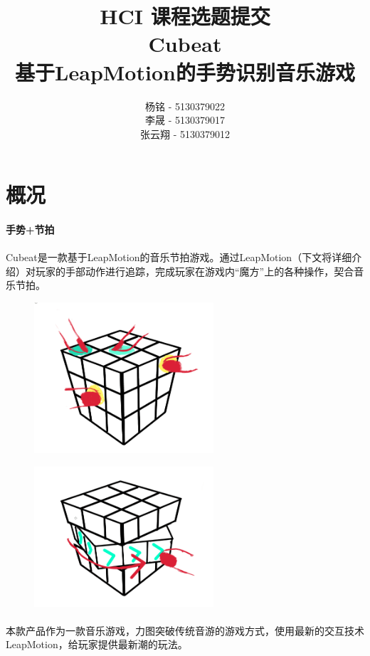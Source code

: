 \documentclass{article}
\author{杨铭 - 5130379022\\
        李晟 - 5130379017\\
        张云翔 - 5130379012}
\title{HCI 课程选题提交\\\textbf{Cubeat\\
基于LeapMotion的手势识别音乐游戏}}
\begin{document}
\maketitle
\tableofcontents
\newpage
\section{概况}
\paragraph{手势+节拍}
\paragraph{}Cubeat是一款基于LeapMotion的音乐节拍游戏。通过LeapMotion（下文将详细介绍）对玩家的手部动作进行追踪，完成玩家在游戏内“魔方”上的各种操作，契合音乐节拍。
\begin{figure}[!h]
\begin{minipage}{0.5\linewidth}
  \includegraphics[width=18em]{pic1.png}\\
  \caption{}\label{1-1}
\end{minipage}
\begin{minipage}{0.5\linewidth}
  \includegraphics[width=18em]{pic2.png}\\
  \caption{}\label{1-2}
\end{minipage}
\end{figure}
\paragraph{}
本款产品作为一款音乐游戏，力图突破传统音游的游戏方式，使用最新的交互技术LeapMotion，给玩家提供最新潮的玩法。
\end{document}
